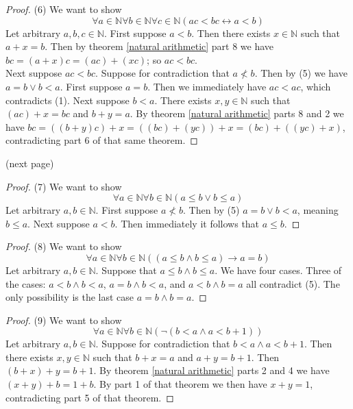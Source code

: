 \documentclass{report}
\begin{document}
\begin{proof}(6)
We want to show
\begin{equation*}
\forall a\in\mathbb N\forall b\in\mathbb N\forall c\in\mathbb N(ac<bc\leftrightarrow a<b)
\end{equation*}
Let arbitrary $a,b,c\in\mathbb N$. First suppose $a<b$. Then there exists $x\in\mathbb N$ such that $a+x=b$. Then by theorem \ref{natural arithmetic} part 8 we have
$bc=(a+x)c=(ac)+(xc)$; so $ac<bc$.\\
\indent Next suppose $ac<bc$. Suppose for contradiction that $a\nless b$. Then by (5) we have $a=b\lor b<a$. First suppose $a=b$. Then we immediately have $ac<ac$, which
contradicts (1). Next suppose $b<a$. There exists $x,y\in\mathbb N$ such that $(ac)+x=bc$ and $b+y=a$. By theorem \ref{natural arithmetic} parts 8 and 2 we have $bc=((b+y)c)+x=((bc)+(yc))+x=(bc)+((yc)+x)$, contradicting part 6 of that same theorem.
\end{proof}
\noindent(next page)\newpage
\begin{proof}(7) We want to show
\begin{equation*}
\forall a\in\mathbb N\forall b\in\mathbb N(a\leq b\lor b\leq a)
\end{equation*}
Let arbitrary $a,b\in\mathbb N$. First suppose $a\nless b$. Then by (5) $a=b\lor b<a$, meaning $b\leq a$. Next suppose $a<b$. Then immediately it follows that $a\leq b$.
\end{proof}
\begin{proof}(8) We want to show
\begin{equation*}
\forall a\in\mathbb N\forall b\in\mathbb N((a\leq b\land b\leq a)\to a=b)
\end{equation*}
Let arbitrary $a,b\in\mathbb N$. Suppose that $a\leq b\land b\leq a$. We have four cases. 
Three of the cases: $a<b\land b<a$, $a=b\land b<a$, and $a<b\land b=a$ all contradict (5). The only possibility is the last case $a=b\land b=a$.
\end{proof}
\begin{proof}(9)
We want to show
\begin{equation*}
\forall a\in\mathbb N\forall b\in\mathbb N(\neg(b<a\land a<b+1))
\end{equation*}
Let arbitrary $a,b\in\mathbb N$. Suppose for contradiction that $b<a\land a<b+1$. Then there exists $x,y\in\mathbb N$ such that $b+x=a$ and $a+y=b+1$.
Then $(b+x)+y=b+1$. By theorem \ref{natural arithmetic} parts 2 and 4 we have $(x+y)+b=1+b$. By part 1 of that theorem we then have $x+y=1$, contradicting part 5 of that theorem.
\end{proof}
\end{document}
